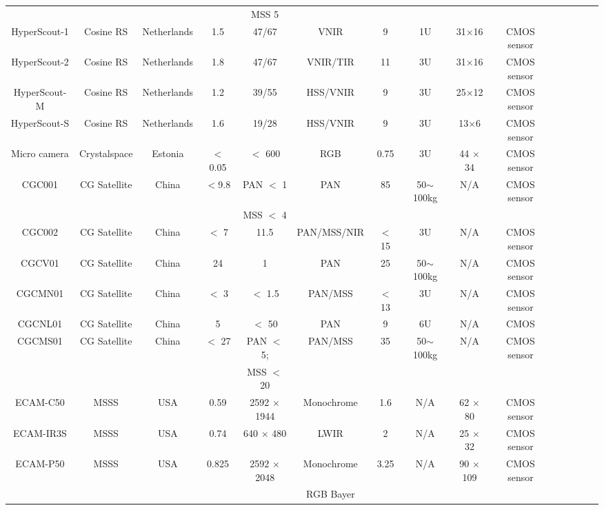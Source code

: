 \documentclass[final,5p,times,twocolumn]{elsarticle}
\begin{document}
\begin{table}
{\begin{tabular}{c c c c c c c c c c c c c c c}
			& & & & MSS 5 & &  & & & & & & & \\
			HyperScout-1 & Cosine RS & Netherlands & 1.5 & 47/67 &VNIR & 9  &  1U & 31$\times$16 & CMOS sensor & \citep{cosine2023}\\ 
			HyperScout-2 & Cosine RS & Netherlands & 1.8 & 47/67 & VNIR/TIR & 11 & 3U & 31$\times$16 & CMOS sensor  & \citep{cosine2023}\\ 
			HyperScout-M & Cosine RS & Netherlands & 1.2 & 39/55 & HSS/VNIR & 9 &  3U & 25$\times$12 & CMOS sensor  & \citep{cosine2023}\\ 
			HyperScout-S & Cosine RS & Netherlands & 1.6 & 19/28 &  HSS/VNIR & 9 &   3U & 13$\times$6 & CMOS sensor & \citep{cosine2023}\\ 
			Micro camera & Crystalspace & Estonia & $<$ 0.05 & $<$ 600 &  RGB & 0.75 & 3U & 44 $\times$ 34 & CMOS sensor  & \citep{slavinskis2015estcube}\\ 
			CGC001 & CG Satellite & China & $<$9.8 & PAN $<$ 1  & PAN & 85 &  50$\sim$100kg & N/A & CMOS sensor & \citep{cgsat2023} \\
			& & & & MSS $<$ 4 & &  & & & & & & & \\
			CGC002 & CG Satellite & China & $<$ 7 & 11.5 &  PAN/MSS/NIR & $<$ 15 &  3U & N/A & CMOS sensor  & \citep{cgsat2023}\\
			CGCV01 & CG Satellite & China &  24 & 1 & PAN & 25 &  50$\sim$100kg & N/A & CMOS sensor & \citep{cgsat2023} \\
			CGCMN01 & CG Satellite & China & $<$ 3 & $<$ 1.5 &  PAN/MSS & $<$ 13 & 3U & N/A & CMOS sensor & \citep{cgsat2023} \\
			CGCNL01 & CG Satellite & China & 5 & $<$ 50 & PAN & 9 & 6U & N/A & CMOS & \citep{cgsat2023} \\
			CGCMS01 & CG Satellite & China & $<$ 27 & PAN $<$ 5; &  PAN/MSS & 35 &  50$\sim$100kg & N/A & CMOS sensor & \citep{cgsat2023}\\
			& & & & MSS $<$ 20 & &  & & & & & & &  \\    
			ECAM-C50 & MSSS & USA & 0.59 & 2592 $\times$ 1944 & Monochrome & 1.6 &  N/A & 62 $\times$ 80 & CMOS  sensor & \citep{malin2023}\\
			ECAM-IR3S & MSSS & USA & 0.74 & 640 $\times$ 480 & LWIR & 2 &  N/A & 25 $\times$ 32 & CMOS sensor & \citep{malin2023}\\
			ECAM-P50 & MSSS & USA & 0.825 & 2592 $\times$ 2048 &  Monochrome & 3.25 & N/A & 90 $\times$ 109 & CMOS sensor  & \citep{malin2023}\\
			& & & & &   RGB Bayer & & & & & & & &\\

\end{tabular}}
\end{table}
\end{document}
